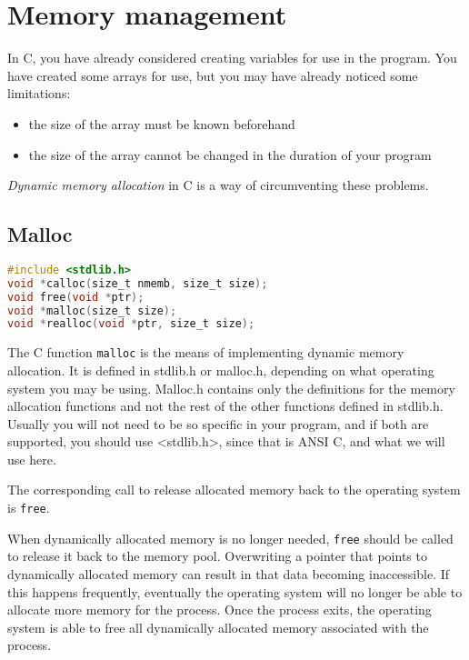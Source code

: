 \section{Memory management}
In C, you have already considered creating variables for use in the program.
You have created some arrays for use, but you may have already noticed some
limitations:
\begin{itemize}
	\item the size of the array must be known beforehand
	\item the size of the array cannot be changed in the duration of your
program
\end{itemize}

\emph{Dynamic memory allocation} in C is a way of circumventing these problems.

\subsection{Malloc}
\lstset{basicstyle=\scriptsize, numbers=left, captionpos=b, tabsize=4}
\begin{lstlisting}[caption=Section \thesection listing \arabic{memcnt},language={C},
breaklines=true,xleftmargin=15pt,label=lst:section\thesection listing\arabic{memcnt}]
#include <stdlib.h>
void *calloc(size_t nmemb, size_t size);
void free(void *ptr);
void *malloc(size_t size);
void *realloc(void *ptr, size_t size);
\end{lstlisting}

The C function \texttt{malloc} is the means of implementing dynamic memory
allocation. It is defined in stdlib.h or malloc.h, depending on what operating
system you may be using. Malloc.h contains only the definitions for the memory
allocation functions and not the rest of the other functions defined in
stdlib.h. Usually you will not need to be so specific in your program, and if
both are supported, you should use \textless{}stdlib.h\textgreater{}, since
that is ANSI C, and what we will use here.

The corresponding call to release allocated memory back to the operating system
is \texttt{free}.

When dynamically allocated memory is no longer needed, \texttt{free} should be
called to release it back to the memory pool. Overwriting a pointer that points
to dynamically allocated memory can result in that data becoming inaccessible.
If this happens frequently, eventually the operating system will no longer be
able to allocate more memory for the process. Once the process exits, the
operating system is able to free all dynamically allocated memory associated
with the process.

